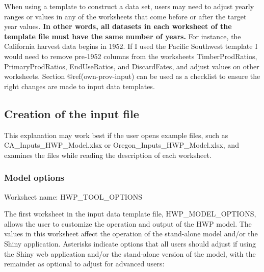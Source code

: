 \documentclass[
  openany]{book}
\begin{document}
When using a template to construct a data set, users may need to adjust
yearly ranges or values in any of the worksheets that come before or
after the target year values. \textbf{In other words, all datasets in
each worksheet of the template file must have the same number of years.}
For instance, the California harvest data begins in 1952. If I used the
Pacific Southwest template I would need to remove pre-1952 columns from
the worksheets TimberProdRatios, PrimaryProdRatios, EndUseRatios, and
DiscardFates, and adjust values on other worksheets. Section
@ref(own-prov-input) can be used as a checklist to ensure the right
changes are made to input data templates.

\hypertarget{own-prov-input}{%
\subsection{Creation of the input file}\label{own-prov-input}}

This explanation may work best if the user opens example files, such as
CA\_Inputs\_HWP\_Model.xlsx or Oregon\_Inputs\_HWP\_Model.xlsx, and
examines the files while reading the description of each worksheet.

\hypertarget{own-prov-input-options}{%
\subsubsection{Model options}\label{own-prov-input-options}}

Worksheet name: HWP\_TOOL\_OPTIONS

The first worksheet in the input data template file,
HWP\_MODEL\_OPTIONS, allows the user to customize the operation and
output of the HWP model. The values in this worksheet affect the
operation of the stand-alone model and/or the Shiny application.
Asterisks indicate options that all users should adjust if using the
Shiny web application and/or the stand-alone version of the model, with
the remainder as optional to adjust for advanced users:
\end{document}
